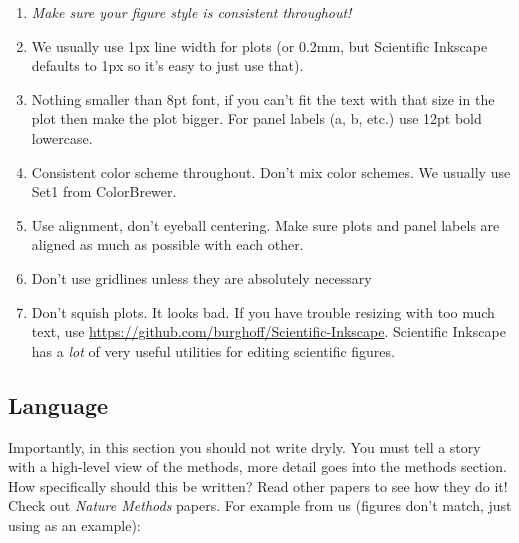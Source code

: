 \begin{refsegment}
\begin{enumerate}
\item \textit{Make sure your figure style is consistent throughout!}
\item We usually use 1px line width for plots (or 0.2mm, but Scientific Inkscape
  defaults to 1px so it's easy to just use that).
\item Nothing smaller than 8pt font, if you can't fit the text with that size in
  the plot then make the plot bigger. For panel labels (a, b, etc.) use 12pt
  bold lowercase.
\item Consistent color scheme throughout. Don't mix color schemes. We usually
  use Set1 from ColorBrewer.
\item Use alignment, don't eyeball centering. Make sure plots and panel labels
  are aligned as much as possible with each other.
\item Don't use gridlines unless they are absolutely necessary
\item Don't squish plots. It looks bad. If you have trouble resizing with too
  much text, use \url{https://github.com/burghoff/Scientific-Inkscape}.
  Scientific Inkscape has a \textit{lot} of very useful utilities for editing
  scientific figures.
\end{enumerate}

\subsection*{Language}

Importantly, in this section you should not write dryly. You must tell a story
with a high-level view of the methods, more detail goes into the methods
section. How specifically should this be written? Read other papers to see how
they do it! Check out \textit{Nature Methods} papers. For example from us
(figures don't match, just using as an example):


\end{refsegment}
